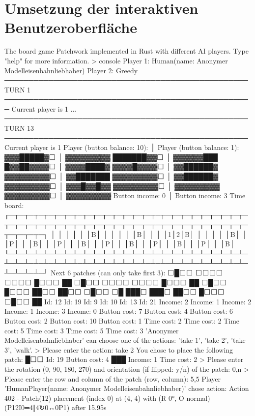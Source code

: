 \chapter{Umsetzung der interaktiven Benutzeroberfläche}
\label{chapter:umsetzung-der-interaktiven-benutzeroberfläche}

{\color{white}
\begin{myverbbox}{\patchworkCLI}
The board game Patchwork implemented in Rust with different AI players. Type "help" for more information.
> console
Player 1: Human(name: Anonymer Modelleisenbahnliebhaber)
Player 2: Greedy
────────────────────────────────────────────────── TURN 1 ───────────────────────────────────────────────────
Current player is 1
...
────────────────────────────────────────────────── TURN 13 ──────────────────────────────────────────────────
Current player is 1
Player (button balance: 10): │ Player (button balance: 1):
  ▓▓▓█████▓⬜  │   ▓▓▓▓▓▓▓▓▓
  ███████▓▓⬜  │   ▓▓▓▓▓▓███
  █▓▓██▓▓▓▓⬜  │   ▓▓▓▓████▓
  ▓▓▓▓█▓▓▓▓⬜  │   ▓▓██████▓
  ▓▓▓▓▓▓▓▓▓⬜  │   ▓▓███████
  ▓▓▓▓▓▓▓▓▓⬜  │   ▓▓██████▓
  ▓▓▓▓▓▓▓▓▓⬜  │   ▓▓▓█▓▓█▓▓
  ▓▓▓▓▓▓▓▓▓⬜  │   ▓▓▓▓▓▓▓▓▓
  ▓▓▓▓▓▓▓▓▓⬜  │   ▓▓▓▓▓▓▓▓▓
      Button income: 0       │      Button income: 3
Time board:
┌─┬─┬─┬─┬─┬─┬─┬─┬─┬─┬─┬─┬─┬─┬─┬─┬─┬─┬─┬─┬─┬─┬─┬─┬─┬─┬─┬─┬─┬─┬─┬─┬─┬─┬─┬─┬─┬─┬─┬─┬─┬─┬─┬─┬─┬─┬─┬─┬─┬─┬─┬─┬─┬─┐
│ │ │ │ │ │B│ │ │ │ │ │B│ │ │ │1│2│B│ │ │ │ │ │B│ │ │P│ │ │B│ │ │P│ │ │B│ │ │P│ │ │B│ │ │P│ │ │B│ │ │P│ │ │B│
└─┴─┴─┴─┴─┴─┴─┴─┴─┴─┴─┴─┴─┴─┴─┴─┴─┴─┴─┴─┴─┴─┴─┴─┴─┴─┴─┴─┴─┴─┴─┴─┴─┴─┴─┴─┴─┴─┴─┴─┴─┴─┴─┴─┴─┴─┴─┴─┴─┴─┴─┴─┴─┴─┘
Next 6 patches (can only take first 3):
⬜█⬜⬜        ⬜⬜⬜⬜        ⬜⬜⬜⬜        █⬜⬜⬜        ██
⬜█⬜⬜        ⬜⬜⬜⬜        ⬜⬜⬜⬜        █⬜⬜⬜        ██
⬜█⬜⬜        █⬜⬜⬜        ██⬜⬜        ██⬜⬜        ⬜█⬜⬜         ⬜█
███⬜        ███⬜        ██⬜⬜        █⬜⬜⬜        ⬜█⬜⬜         ██
Id: 12            Id: 19            Id: 9             Id: 10            Id: 13             Id: 21
Income: 2         Income: 1         Income: 2         Income: 1         Income: 3          Income: 0
Button cost: 7    Button cost: 4    Button cost: 6    Button cost: 2    Button cost: 10    Button cost: 1
Time cost: 2      Time cost: 2      Time cost: 5      Time cost: 3      Time cost: 5       Time cost: 3
'Anonymer Modelleisenbahnliebhaber' can choose one of the actions: 'take 1', 'take 2', 'take 3', 'walk'.
> Please enter the action: take 2
You chose to place the following patch:
   █⬜⬜   Id: 19       Button cost: 4
   ███   Income: 1    Time cost: 2
> Please enter the  rotation (0, 90, 180, 270) and orientation (if flipped: y/n) of the patch: 0,n
> Please enter the row and column of the patch (row, column): 5,5
Player 'HumanPlayer(name: Anonymer Modelleisenbahnliebhaber)' chose action:
Action 402 - Patch(12) placement (index 0) at (4, 4) with (R 0°, O normal) (P12I0═4‖4↻0↔0P1) after 15.95s
\end{myverbbox}
}


